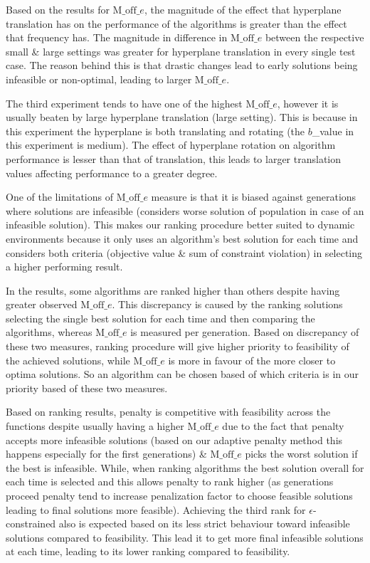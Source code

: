 \documentclass[conference]{IEEEtran}
\begin{document}
Based on the results for $\text{M\_off}\_e$, the magnitude of the effect that hyperplane translation has on the performance of the algorithms is greater than the effect that frequency has. The magnitude in difference in $\text{M\_off}\_e$ between the respective small \& large settings was greater for hyperplane translation in every single test case. The reason behind this is that drastic changes lead to early solutions being infeasible or non-optimal, leading to larger $\text{M\_off}\_e$.

The third experiment tends to have one of the highest $\text{M\_off}\_e$, however it is usually beaten by large hyperplane translation (large setting). This is because in this experiment the hyperplane is both translating and rotating (the $b$\_value in this experiment is medium). The effect of hyperplane rotation on algorithm performance is lesser than that of translation, this leads to larger translation values affecting performance to a greater degree.

One of the limitations of $\text{M\_off}\_e$ measure is that it is biased against generations where solutions are infeasible (considers worse solution of population in case of an infeasible solution). This makes our ranking procedure better suited to dynamic environments because it only uses an algorithm's best solution for each time and considers both criteria (objective value \& sum of constraint violation) in selecting a higher performing result.

In the results, some algorithms are ranked higher than others despite having greater observed $\text{M\_off}\_e$. This discrepancy is caused by the ranking solutions selecting the single best solution for each time and then comparing the algorithms, whereas $\text{M\_off}\_e$ is measured per generation. 
Based on discrepancy of these two measures, ranking procedure will give higher priority to feasibility of the achieved solutions, while $\text{M\_off}\_e$ is more in favour of the more closer to optima solutions. So an algorithm can be chosen based of which criteria is in our priority based of these two measures.

Based on ranking results, penalty is competitive with feasibility across the functions despite usually having a higher $\text{M\_off}\_e$ due to the fact that penalty accepts more infeasible solutions (based on our adaptive penalty method this happens especially for the first generations) \& $\text{M\_off}\_e$ picks the worst solution if the best is infeasible. While, when ranking algorithms the best solution overall for each time is selected and this allows penalty to rank higher (as generations proceed penalty tend to increase penalization factor to choose feasible solutions leading to final solutions more feasible).
Achieving the third rank for $\epsilon$-constrained also is expected based on its less strict behaviour toward infeasible solutions compared to feasibility. This lead it to get more final infeasible solutions at each time, leading to its lower ranking compared to feasibility.
\end{document}
